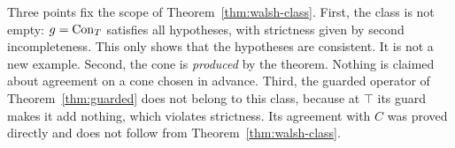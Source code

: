 Three points fix the scope of Theorem~\ref{thm:walsh-class}. First, the class is not empty: $g=\mathrm{Con}_T$ satisfies all hypotheses, with strictness given by second incompleteness. This only shows that the hypotheses are consistent. It is not a new example. Second, the cone is \emph{produced} by the theorem. Nothing is claimed about agreement on a cone chosen in advance. Third, the guarded operator of Theorem~\ref{thm:guarded} does not belong to this class, because at $\top$ its guard makes it add nothing, which violates strictness. Its agreement with $C$ was proved directly and does not follow from Theorem~\ref{thm:walsh-class}.
